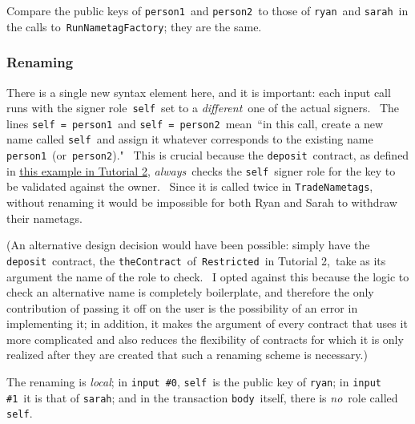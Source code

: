 \documentclass[11pt]{article}
\DeclareRobustCommand{\fuline}[1]{\texorpdfstring{\uline{#1}}{#1}}
\begin{document}
Compare the public keys of \texttt{person1} and \texttt{person2} to those of \texttt{ryan} and \texttt{sarah} in the calls to \texttt{RunNametagFactory}; they are the same.

\subsubsection{Renaming}
\vspace{5.5pt}

There is a single new syntax element here, and it is important: each input call runs with the signer role \texttt{self} set to a \textit{different} one of the actual signers.  The lines \texttt{self = person1} and \texttt{self = person2} mean “in this call, create a new name called \texttt{self} and assign it whatever corresponds to the existing name \texttt{person1} (or \texttt{person2})."  This is crucial because the \texttt{deposit} contract, as defined in \href{https://consensys.quip.com/2wGTAw6Fgm87/Tutorial-2-Escrows\%23ZRIACALxPlb}{\fuline{this example in Tutorial 2}}, \textit{always} checks the \texttt{self} signer role for the key to be validated against the owner.  Since it is called twice in \texttt{TradeNametags}, without renaming it would be impossible for both Ryan and Sarah to withdraw their nametags.


\vspace{11pt}

(An alternative design decision would have been possible: simply have the \texttt{deposit} contract, the \texttt{theContract} of \texttt{Restricted} in Tutorial 2, take as its argument the name of the role to check.  I opted against this because the logic to check an alternative name is completely boilerplate, and therefore the only contribution of passing it off on the user is the possibility of an error in implementing it; in addition, it makes the argument of every contract that uses it more complicated and also reduces the flexibility of contracts for which it is only realized after they are created that such a renaming scheme is necessary.)


\vspace{11pt}

The renaming is \textit{local}; in \texttt{input \#0}, \texttt{self} is the public key of \texttt{ryan}; in \texttt{input \#1} it is that of \texttt{sarah}; and in the transaction \texttt{body} itself, there is \textit{no} role called \texttt{self}.
\end{document}
